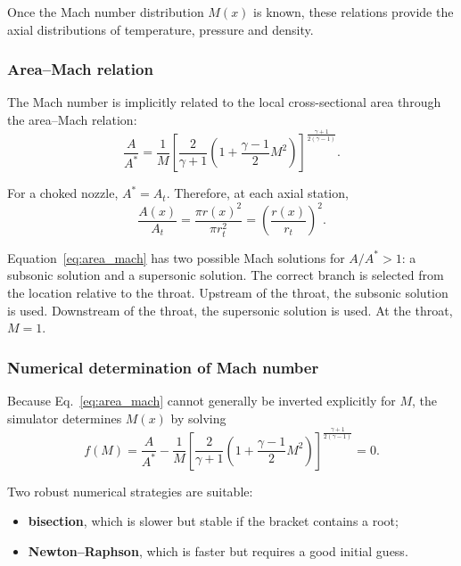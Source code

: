 \documentclass[journal,article,submit,oneauthor]{Definitions/mdpi}
\begin{document}
Once the Mach number distribution $M(x)$ is known, these relations provide the axial distributions of temperature, pressure and density.

\subsubsection{Area--Mach relation}

The Mach number is implicitly related to the local cross-sectional area through the area--Mach relation:
\begin{equation}
\frac{A}{A^*}=\frac{1}{M}
\left[
\frac{2}{\gamma+1}
\left(1+\frac{\gamma-1}{2}M^2\right)
\right]^\frac{\gamma+1}{2(\gamma-1)} .
\label{eq:area_mach}
\end{equation}

For a choked nozzle, $A^*=A_t$. Therefore, at each axial station,
\begin{equation}
\frac{A(x)}{A_t}=\frac{\pi r(x)^2}{\pi r_t^2}=\left(\frac{r(x)}{r_t}\right)^2 .
\label{eq:area_ratio_local}
\end{equation}

Equation~\eqref{eq:area_mach} has two possible Mach solutions for $A/A^*>1$: a subsonic solution and a supersonic solution. The correct branch is selected from the location relative to the throat. Upstream of the throat, the subsonic solution is used. Downstream of the throat, the supersonic solution is used. At the throat, $M=1$.

\subsubsection{Numerical determination of Mach number}

Because Eq.~\eqref{eq:area_mach} cannot generally be inverted explicitly for $M$, the simulator determines $M(x)$ by solving
\begin{equation}
f(M)=\frac{A}{A^*} - \frac{1}{M}
\left[
\frac{2}{\gamma+1}
\left(1+\frac{\gamma-1}{2}M^2\right)
\right]^\frac{\gamma+1}{2(\gamma-1)}=0 .
\label{eq:area_mach_residual}
\end{equation}

Two robust numerical strategies are suitable:
\begin{itemize}
    \item \textbf{bisection}, which is slower but stable if the bracket contains a root;
    \item \textbf{Newton--Raphson}, which is faster but requires a good initial guess.
\end{itemize}
\end{document}

